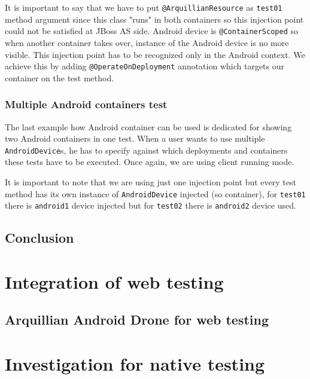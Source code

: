 \documentclass[12pt,final,oneside]{fithesis}
\begin{document}

	
It is important to say that we have to put \texttt{@ArquillianResource} as \texttt{test01} method argument since this class "runs" in both containers so this injection point could not be satisfied at JBoss AS side. Android device is \texttt{@ContainerScoped} so when another container takes over, instance of the Android device is no more visible. This injection point has to be recognized only in the Android context. We achieve this by adding \texttt{@OperateOnDeployment} annotation which targets our container on the test method.

		\subsection{Multiple Android containers test}

The last example how Android container can be used is dedicated for showing two Android containers in one test. When a user wants to use multiple \texttt{AndroidDevice}s, he has to specify against which deployments and containers these tests have to be executed. Once again, we are using client running mode.  



It is important to note that we are using just one injection point but every test method has its own instance of \texttt{AndroidDevice} injected (so container), for \texttt{test01} there is \texttt{android1} device injected but for \texttt{test02} there is \texttt{android2} device used.

	\section{Conclusion}

\chapter{Integration of web testing}

	\section{Arquillian Android Drone for web testing}

\chapter{Investigation for native testing}
\end{document}
